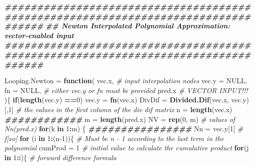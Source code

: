 \documentclass[
]{book}
\newenvironment{Shaded}{\begin{snugshade}}{\end{snugshade}}
\newcommand{\AttributeTok}[1]{\textcolor[rgb]{0.13,0.29,0.53}{#1}}
\newcommand{\CommentTok}[1]{\textcolor[rgb]{0.56,0.35,0.01}{\textit{#1}}}
\newcommand{\ConstantTok}[1]{\textcolor[rgb]{0.56,0.35,0.01}{#1}}
\newcommand{\ControlFlowTok}[1]{\textcolor[rgb]{0.13,0.29,0.53}{\textbf{#1}}}
\newcommand{\DecValTok}[1]{\textcolor[rgb]{0.00,0.00,0.81}{#1}}
\newcommand{\DocumentationTok}[1]{\textcolor[rgb]{0.56,0.35,0.01}{\textbf{\textit{#1}}}}
\newcommand{\FunctionTok}[1]{\textcolor[rgb]{0.13,0.29,0.53}{\textbf{#1}}}
\newcommand{\NormalTok}[1]{#1}
\newcommand{\OtherTok}[1]{\textcolor[rgb]{0.56,0.35,0.01}{#1}}
\newcommand{\SpecialCharTok}[1]{\textcolor[rgb]{0.81,0.36,0.00}{\textbf{#1}}}
\begin{document}
\begin{Shaded}
\begin{Highlighting}[]
\DocumentationTok{\#\#\#\#\#\#\#\#\#\#\#\#\#\#\#\#\#\#\#\#\#\#\#\#\#\#\#\#\#\#\#\#\#\#\#\#\#\#\#\#\#\#\#\#\#\#\#\#\#\#\#\#\#\#\#\#\#\#\#\#\#\#\#\#\#\#\#\#\#\#\#\#\#\#\#\#\#\#\#\#\#\#}
\DocumentationTok{\#\#  Newton Interpolated Polynomial Approximation: vector{-}enabled input}
\DocumentationTok{\#\#\#\#\#\#\#\#\#\#\#\#\#\#\#\#\#\#\#\#\#\#\#\#\#\#\#\#\#\#\#\#\#\#\#\#\#\#\#\#\#\#\#\#\#\#\#\#\#\#\#\#\#\#\#\#\#\#\#\#\#\#\#\#\#\#\#\#\#\#\#\#\#\#\#\#\#\#\#\#\#\#}

\NormalTok{Looping.Newton }\OtherTok{=} \ControlFlowTok{function}\NormalTok{( vec.x,            }\CommentTok{\# input interpolation nodes}
                                \AttributeTok{vec.y =} \ConstantTok{NULL}\NormalTok{,    }
                                \AttributeTok{fn =} \ConstantTok{NULL}\NormalTok{,        }\CommentTok{\# either vec.y or fn must be provided}
\NormalTok{                                pred.x            }\CommentTok{\# VECTOR INPUT!!!}
\NormalTok{                              )\{}
   \ControlFlowTok{if}\NormalTok{(}\FunctionTok{length}\NormalTok{(vec.y) }\SpecialCharTok{==}\DecValTok{0}\NormalTok{) vec.y }\OtherTok{=} \FunctionTok{fn}\NormalTok{(vec.x)}
\NormalTok{   DivDif }\OtherTok{=} \FunctionTok{Divided.Dif}\NormalTok{(vec.x, vec.y)[,}\DecValTok{1}\NormalTok{]       }\CommentTok{\# the values in the first column of the div dif matrix}
\NormalTok{   n }\OtherTok{=} \FunctionTok{length}\NormalTok{(vec.x)}
   \DocumentationTok{\#\#\#\#\#\#\#\#\#\#\#\#}
\NormalTok{   m }\OtherTok{=} \FunctionTok{length}\NormalTok{(pred.x)}
\NormalTok{   NV }\OtherTok{=} \FunctionTok{rep}\NormalTok{(}\DecValTok{0}\NormalTok{, m)                 }\CommentTok{\# values of Nn(pred.x)}
   \ControlFlowTok{for}\NormalTok{(k }\ControlFlowTok{in} \DecValTok{1}\SpecialCharTok{:}\NormalTok{m) \{}
   \DocumentationTok{\#\#\#\#\#\#\#\#\#\#\#\#\#\#\#\#}
\NormalTok{   Nn }\OtherTok{=}\NormalTok{ vec.y[}\DecValTok{1}\NormalTok{]                  }\CommentTok{\# f[xo]}
   \ControlFlowTok{for}\NormalTok{ (i }\ControlFlowTok{in} \DecValTok{1}\SpecialCharTok{:}\NormalTok{(n}\DecValTok{{-}1}\NormalTok{))\{            }\CommentTok{\# Must be n {-} 1 according to the last term in the polynomial}
\NormalTok{     cumProd }\OtherTok{=} \DecValTok{1}                  \CommentTok{\# initial value to calculate the cumulative product}
     \ControlFlowTok{for}\NormalTok{(j }\ControlFlowTok{in} \DecValTok{1}\SpecialCharTok{:}\NormalTok{i)\{               }\CommentTok{\# forward difference formula}

\end{Highlighting}
\end{Shaded}
\end{document}

